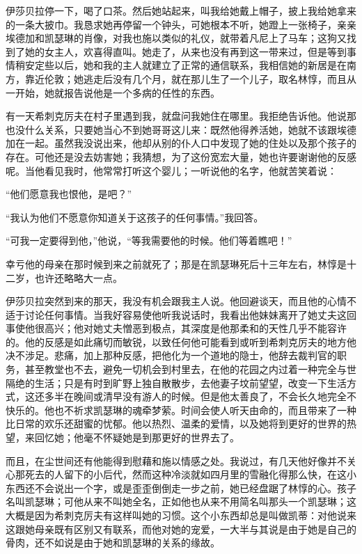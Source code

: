 \par 伊莎贝拉停一下，喝了口茶。然后她站起来，叫我给她戴上帽子，披上我给她拿来的一条大披巾。我恳求她再停留一个钟头，可她根本不听，她蹬上一张椅子，亲亲埃德加和凯瑟琳的肖像，对我也施以类似的礼仪，就带着凡尼上了马车；这狗又找到了她的女主人，欢喜得直叫。她走了，从来也没有再到这一带来过，但是等到事情稍安定些以后，她和我的主人就建立了正常的通信联系，我相信她的新居是在南方，靠近伦敦；她逃走后没有几个月，就在那儿生了一个儿子，取名林惇，而且从一开始，她就报告说他是一个多病的任性的东西。
\par 有一天希刺克厉夫在村子里遇到我，就盘问我她住在哪里。我拒绝告诉他。他说那也没什么关系，只要她当心不到她哥哥这儿来：既然他得养活她，她就不该跟埃德加在一起。虽然我没说出来，他却从别的仆人口中发现了她的住处以及那个孩子的存在。可他还是没去妨害她；我猜想，为了这份宽宏大量，她也许要谢谢他的反感呢。当他看见我时，他常常打听这个婴儿；一听说他的名字，他就苦笑着说：
\par “他们愿意我也恨他，是吧？”
\par “我认为他们不愿意你知道关于这孩子的任何事情。”我回答。
\par “可我一定要得到他，”他说，“等我需要他的时候。他们等着瞧吧！”
\par 幸亏他的母亲在那时候到来之前就死了；那是在凯瑟琳死后十三年左右，林惇是十二岁，也许还略略大一点。
\par 伊莎贝拉突然到来的那天，我没有机会跟我主人说。他回避谈天，而且他的心情不适于讨论任何事情。当我好容易使他听我说话时，我看出他妹妹离开了她丈夫这回事使他很高兴；他对她丈夫憎恶到极点，其深度是他那柔和的天性几乎不能容许的。他的反感是如此痛切而敏锐，以致任何他可能看到或听到希刺克厉夫的地方他决不涉足。悲痛，加上那种反感，把他化为一个道地的隐士，他辞去裁判官的职务，甚至教堂也不去，避免一切机会到村里去，在他的花园之内过着一种完全与世隔绝的生活；只是有时到旷野上独自散散步，去他妻子坟前望望，改变一下生活方式，这还多半在晚间或清早没有游人的时候。但是他太善良了，不会长久地完全不快乐的。他也不祈求凯瑟琳的魂牵梦萦。时间会使人听天由命的，而且带来了一种比日常的欢乐还甜蜜的忧郁。他以热烈、温柔的爱情，以及她将到更好的世界的热望，来回忆她；他毫不怀疑她是到那更好的世界去了。
\par 而且，在尘世间还有他能得到慰藉和施以情感之处。我说过，有几天他好像并不关心那死去的人留下的小后代，然而这种冷淡就如四月里的雪融化得那么快，在这小东西还不会说出一个字，或是歪歪倒倒走一步之前，她已经盘踞了林惇的心。孩子名叫凯瑟琳；可他从来不叫她全名，正如他也从来不用简名叫那头一个凯瑟琳；这大概是因为希刺克厉夫有这样叫她的习惯。这个小东西却总是叫做凯蒂：对他说来这跟她母亲既有区别又有联系，而他对她的宠爱，一大半与其说是由于她是自己的骨肉，还不如说是由于她和凯瑟琳的关系的缘故。
